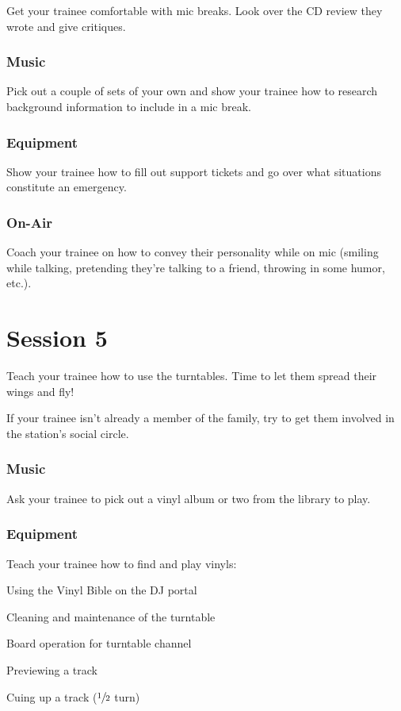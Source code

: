 \documentclass{witrman}
\begin{document}
Get your trainee comfortable with mic breaks.  Look over the CD review they
wrote and give critiques.

\subsection{Music}

Pick out a couple of sets of your own and show your trainee how to research
background information to include in a mic break.

\subsection{Equipment}

Show your trainee how to fill out support tickets and go over what situations
constitute an emergency.

\subsection{On-Air}

Coach your trainee on how to convey their personality while on mic (smiling
while talking, pretending they're talking to a friend, throwing in some humor,
etc.).


\chapter{Session 5}

Teach your trainee how to use the turntables.  Time to let them spread their
wings and fly!

If your trainee isn't already a member of the family, try to get them involved
in the station's social circle.

\subsection{Music}

Ask your trainee to pick out a vinyl album or two from the library to play.

\subsection{Equipment}

Teach your trainee how to find and play vinyls:
\begin{skinnyitemize}
    \item Using the Vinyl Bible on the DJ portal
    \item Cleaning and maintenance of the turntable
    \item Board operation for turntable channel
    \item Previewing a track
    \item Cuing up a track ($\sfrac{1}{2}$ turn)
\end{skinnyitemize}
\end{document}
